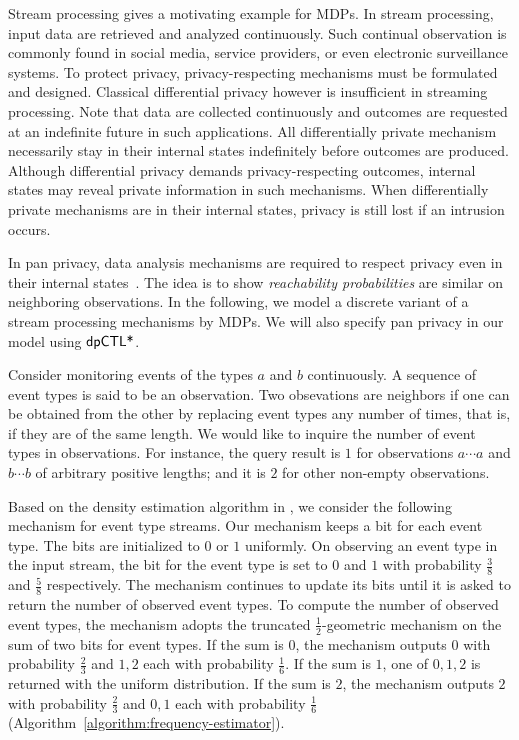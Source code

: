 
Stream processing gives a motivating example for MDPs. In stream
processing, input data are retrieved and
analyzed continuously. Such continual observation is commonly found
in social media, service providers, or even electronic surveillance
systems. To protect privacy, privacy-respecting mechanisms must be
formulated and designed. Classical differential privacy however is
insufficient in streaming processing. Note that data are collected
continuously and outcomes are requested at an indefinite future
in such applications. All differentially private
mechanism necessarily stay in their internal states indefinitely
before outcomes are produced. Although differential privacy demands
privacy-respecting outcomes, internal states may reveal private
information in such mechanisms. When differentially private mechanisms
are in their internal states, privacy is still lost if an intrusion
occurs.

In pan privacy, data analysis mechanisms are required to respect
privacy even in their internal states~\cite{DNPR:10:DPCO,DNPRY:10:PPSA}.
The idea is to show \emph{reachability probabilities} are similar on
neighboring observations. In the following, we model a discrete
variant of a stream processing mechanisms by MDPs. We will also
specify pan privacy in our model using $\textsf{dpCTL*}$.

Consider monitoring events of the types $a$ and $b$ continuously.
A sequence of event types is said to be an observation. Two
obsevations are {neighbors} if one can be obtained from the other
by replacing event types any number of times, that is, if they are of
the same length. %
We would like to inquire the number of event types in
observations. For instance, the query result is $1$
for observations $a \cdots a$ and $b \cdots b$ of arbitrary positive
lengths; and it is $2$ for other non-empty observations.

Based on the density estimation algorithm in \cite{DNPRY:10:PPSA}, we
consider the following mechanism for event type streams. Our mechanism
keeps a bit for each event type. The bits are initialized to $0$ or
$1$ uniformly. On observing an event type in the input stream, the
bit for the event type is set to $0$ and $1$ with probability
$\frac{3}{8}$ and $\frac{5}{8}$ respectively. The mechanism continues
to update its bits until it is asked to return the number of observed
event types. To compute the number of observed event types, the
mechanism adopts the truncated $\frac{1}{2}$-geometric mechanism on the sum of
two bits for event types. If the sum is $0$, the mechanism outputs $0$
with probability $\frac{2}{3}$ and $1, 2$ each with probability
$\frac{1}{6}$. If the sum is $1$, one of $0, 1, 2$ is returned with
the uniform distribution. If the sum is $2$, the mechanism outputs $2$
with probability $\frac{2}{3}$ and $0, 1$ each with probability
$\frac{1}{6}$ (Algorithm~\ref{algorithm:frequency-estimator}).

